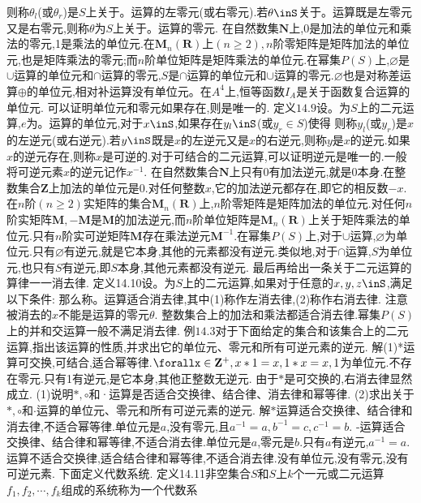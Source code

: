 则称$\theta_{l}$(或$\theta_{r}$)是$S$上关于。运算的左零元(或右零元).若$\theta\inS$关于。运算既是左零元又是右零元,则称$\theta$为$S$上关于。运算的零元.
在自然数集$\mathbf{N}$上,0是加法的单位元和乘法的零元,1是乘法的单位元.在$\boldsymbol{M}_{n}(\mathbf{R})$上$(n\geqslant2),n$阶零矩阵是矩阵加法的单位元,也是矩阵乘法的零元;而$n$阶单位矩阵是矩阵乘法的单位元.在幂集$P(S)$上,$\varnothing$是$\cup$运算的单位元和$\cap$运算的零元,$S$是$\cap$运算的单位元和$\cup$运算的零元.$\varnothing$也是对称差运算$\oplus$的单位元,相对补运算没有单位元。在$A^{4}$上,恒等函数$I_{A}$是关于函数复合运算的单位元.
可以证明单位元和零元如果存在,则是唯一的.
定义$14.9$设。为$S$上的二元运算,$e$为。运算的单位元,对于$x\inS$,如果存在$y_{l}\inS$(或$y_{r}\in$$S$)使得
则称$y_{l}$(或$y_{r}$)是$x$的左逆元(或右逆元).若$y\inS$既是$x$的左逆元又是$x$的右逆元,则称$y$是$x$的逆元.如果$x$的逆元存在,则称$x$是可逆的.对于可结合的二元运算,可以证明逆元是唯一的.一般将可逆元素$x$的逆元记作$x^{-1}$.
在自然数集合$\mathbf{N}$上只有0有加法逆元,就是0本身.在整数集合$\mathbf{Z}$上加法的单位元是0.对任何整数$x$,它的加法逆元都存在,即它的相反数$-x$.在$n$阶$(n\geqslant2)$实矩阵的集合$\boldsymbol{M}_{n}(\mathbf{R})$上,$n$阶零矩阵是矩阵加法的单位元.对任何$n$阶实矩阵$\boldsymbol{M},-\boldsymbol{M}$是$\boldsymbol{M}$的加法逆元,而$n$阶单位矩阵是$\boldsymbol{M}_{n}(\mathbf{R})$上关于矩阵乘法的单位元.只有$n$阶实可逆矩阵$\boldsymbol{M}$存在乘法逆元$\boldsymbol{M}^{-1}$.在幂集$P(S)$上,对于$\cup$运算,$\varnothing$为单位元.只有$\varnothing$有逆元,就是它本身,其他的元素都没有逆元.类似地,对于$\cap$运算,$S$为单位元,也只有$S$有逆元,即$S$本身,其他元素都没有逆元.
最后再给出一条关于二元运算的算律一一消去律.
定义14.10设。为$S$上的二元运算,如果对于任意的$x,y,z\inS$,满足以下条件:
那么称。运算适合消去律,其中(1)称作左消去律,(2)称作右消去律.
注意被消去的$x$不能是运算的零元$\theta$.
整数集合上的加法和乘法都适合消去律.幂集$P(S)$上的并和交运算一般不满足消去律.
例$14.3$对于下面给定的集合和该集合上的二元运算,指出该运算的性质,并求出它的单位元、零元和所有可逆元素的逆元.
解(1)*运算可交换,可结合,适合幂等律.$\forallx\in\mathbf{Z}^{+},x*1=x,1*x=x,1$为单位元.不存在零元.只有1有逆元,是它本身,其他正整数无逆元.
由于$*$是可交换的,右消去律显然成立.
(1)说明$*,\circ$和·运算是否适合交换律、结合律、消去律和幂等律.
(2)求出关于$*,\circ$和$\cdot$运算的单位元、零元和所有可逆元素的逆元.
解$*$运算适合交换律、结合律和消去律,不适合幂等律.单位元是$a$,没有零元,且$a^{-1}=a,b^{-1}=c,c^{-1}=b$.
-运算适合交换律、结合律和幂等律,不适合消去律.单位元是$a$,零元是$b$.只有$a$有逆元,$a^{-1}=a$.
运算不适合交换律,适合结合律和幂等律,不适合消去律.没有单位元,没有零元,没有可逆元素.
下面定义代数系统.
定义14.11非空集合$S$和$S$上$k$个一元或二元运算$f_{1},f_{2},\cdots,f_{k}$组成的系统称为一个代数系
$$
